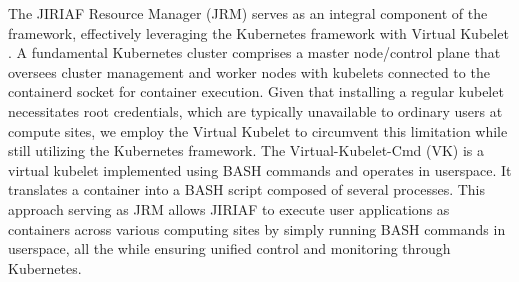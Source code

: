 The JIRIAF Resource Manager (JRM) serves as an integral component of the framework, effectively leveraging the Kubernetes framework with Virtual Kubelet \cite{virtual-kubelet}. A fundamental Kubernetes cluster comprises a master node/control plane that oversees cluster management and worker nodes with kubelets connected to the containerd socket for container execution. Given that installing a regular kubelet necessitates root credentials, which are typically unavailable to ordinary users at compute sites, we employ the Virtual Kubelet to circumvent this limitation while still utilizing the Kubernetes framework. The Virtual-Kubelet-Cmd (VK) is a virtual kubelet implemented using BASH commands and operates in userspace. It translates a container into a BASH script composed of several processes. This approach serving as JRM allows JIRIAF to execute user applications as containers across various computing sites by simply running BASH commands in userspace, all the while ensuring unified control and monitoring through Kubernetes.







